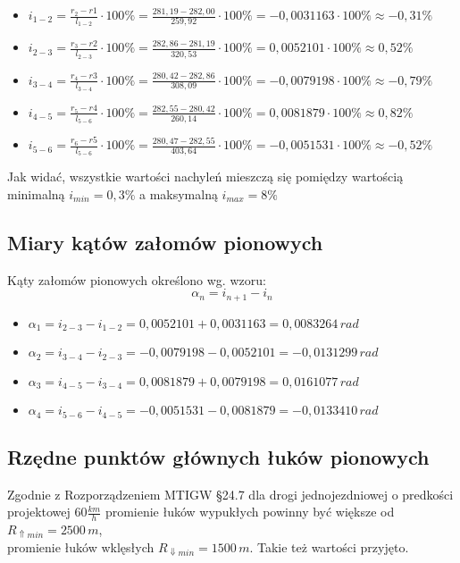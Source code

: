 \documentclass[12pt]{article}
\begin{document}
        \begin{itemize}
            \item \( i_{1-2} = \frac{r_{2} - r{1}}{l_{1-2}} \cdot 100\% = \frac{281,19 - 282,00}{259,92} \cdot 100\% = -0,0031163 \cdot 100\% \approx -0,31\% \)
            \item \( i_{2-3} = \frac{r_{3} - r{2}}{l_{2-3}} \cdot 100\% = \frac{282,86 - 281,19}{320,53} \cdot 100\% = 0,0052101 \cdot 100\% \approx 0,52\% \)
            \item \( i_{3-4} = \frac{r_{4} - r{3}}{l_{3-4}} \cdot 100\% = \frac{280,42 - 282,86}{308,09} \cdot 100\% = -0,0079198 \cdot 100\% \approx -0,79\% \)
            \item \( i_{4-5} = \frac{r_{5} - r{4}}{l_{5-6}} \cdot 100\% = \frac{282,55 - 280,42}{260,14} \cdot 100\% = 0,0081879 \cdot 100\% \approx 0,82\% \)
            \item \( i_{5-6} = \frac{r_{6} - r{5}}{l_{5-6}} \cdot 100\% = \frac{280,47 - 282,55}{403,64} \cdot 100\% = -0,0051531 \cdot 100\% \approx -0,52\% \)
        \end{itemize}
        Jak widać, wszystkie wartości nachyleń mieszczą się pomiędzy wartością\\
        minimalną \(i_{min}=0,3\%\) a maksymalną \( i_{max} = 8\% \)
        \newpage
    \subsection{Miary kątów załomów pionowych}
        Kąty załomów pionowych określono wg. wzoru:
        \begin{equation}
            \alpha_{n} = i_{n+1} - i_{n}
        \end{equation}

        \begin{itemize}
            \item \( \alpha_{1} = i_{2-3} - i_{1-2} = 0,0052101 + 0,0031163 = 0,0083264\,rad \)
            \item \( \alpha_{2} = i_{3-4} - i_{2-3} = -0,0079198 - 0,0052101 = -0,0131299\,rad \)
            \item \( \alpha_{3} = i_{4-5} - i_{3-4} = 0,0081879 + 0,0079198 = 0,0161077\,rad \)
            \item \( \alpha_{4} = i_{5-6} - i_{4-5} = -0,0051531 - 0,0081879 = -0,0133410\,rad \)
        \end{itemize}
    \subsection{Rzędne punktów głównych łuków pionowych}
        Zgodnie z Rozporządzeniem MTIGW §24.7 dla drogi jednojezdniowej o predkości\\
        projektowej \(60 \frac{km}{h}\) promienie łuków wypukłych powinny być większe od \(R_{\Uparrow min} = 2500\,m\),\\
        promienie łuków wklęsłych \(R_{\Downarrow min} = 1500\,m\). Takie też wartości przyjęto.
\end{document}
